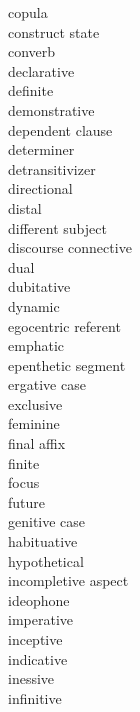 \begin{multicols}{2}
\begin{tabbing}
\cop{} \> copula\\
\cs{} \> construct state\\
\cvb{} \> converb\\
\decl{} \> declarative\\
 \> definite\\
\dem{} \> demonstrative\\
\dep{} \> dependent clause\\
\deter{} \> determiner\\
\detr{} \> detransitivizer\\
\dir{} \> directional\\
\dist{} \> distal\\
\dsbj{} \> different subject\\
\dscn{} \> discourse connective\\
\du{} \> dual\\
\dubt{} \> dubitative\\
\dyn{} \> dynamic\\
\ego{} \> egocentric referent\\
\emphat{} \> emphatic\\
\epen{} \> epenthetic segment\\
\erg{} \> ergative case\\
\excl{} \> exclusive\\
\fem{} \> feminine\\
\faff \> final affix\\
\fin{} \> finite\\
\foc{} \> focus\\
\fut{} \> future\\
\gen{} \> genitive case\\
\hab{} \> habituative\\
\Hyp{} \> hypothetical\\
\icml{} \> incompletive aspect\\
\ideoph{} \> ideophone\\
\imp{} \> imperative\\
\incep{} \> inceptive\\
\ind{} \> indicative\\
\ines{} \> inessive\\
\Inf{} \> infinitive\\

\end{tabbing}
\end{multicols}
